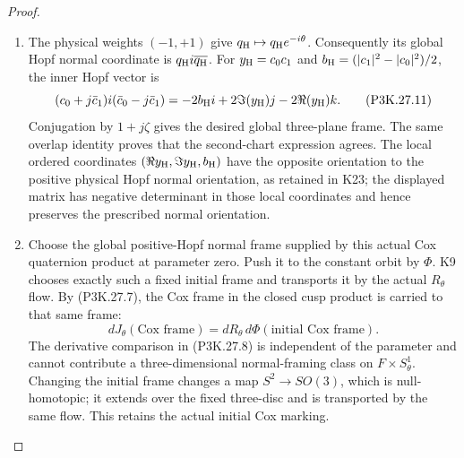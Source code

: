 \begin{proof}
\begin{enumerate}[label=\arabic*.]
\item The physical weights \((-1,+1)\) give
\(q_{\rm H}\mapsto q_{\rm H}e^{-i\theta}\).
Consequently its global Hopf normal coordinate is
\(q_{\rm H}i\overline{q_{\rm H}}\).
For \(y_{\rm H}=c_0c_1\) and
\(b_{\rm H}=(|c_1|^2-|c_0|^2)/2\), the inner Hopf vector is
\[
 (c_0+j\bar c_1)i(\bar c_0-j\bar c_1)
   =-2b_{\rm H}i+2\Im(y_{\rm H})j-2\Re(y_{\rm H})k.
                                                        \tag{P3K.27.11}
\]
Conjugation by \(1+j\zeta\) gives the desired global
three-plane frame. The same overlap identity proves that
the second-chart expression agrees. The local ordered
coordinates \((\Re y_{\rm H},\Im y_{\rm H},b_{\rm H})\)
have the opposite orientation to the positive physical
Hopf normal orientation, as retained in K23; the displayed
matrix has negative determinant in those local coordinates
and hence preserves the prescribed normal orientation.

\item Choose the global positive-Hopf normal frame supplied by
this actual Cox quaternion product at parameter zero.
Push it to the constant orbit by \(\Phi\). K9 chooses
exactly such a fixed initial frame and transports it by
the actual \(R_\theta\) flow. By (P3K.27.7), the Cox
frame in the closed cusp product is carried to that same
frame:
\[
        dJ_\theta(\text{Cox frame})
           =dR_\theta\,d\Phi(\text{initial Cox frame}).
                                                        \tag{P3K.27.9}
\]
The derivative comparison in (P3K.27.8) is independent
of the parameter and cannot contribute a three-dimensional
normal-framing class on \(F\times S^1_\theta\).
Changing the initial frame changes a map
\(S^2\to SO(3)\), which is null-homotopic; it extends
over the fixed three-disc and is transported by the same
flow. This retains the actual initial Cox marking.


\end{enumerate}
\end{proof}
